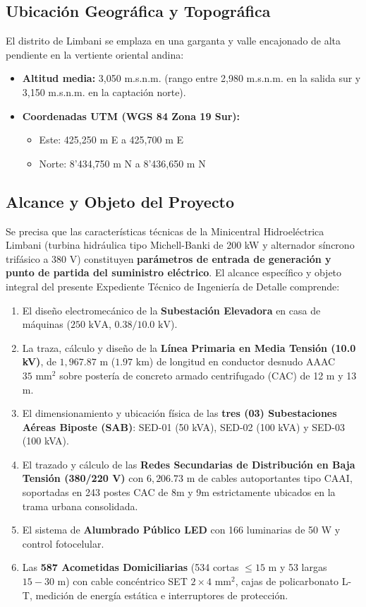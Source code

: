 \subsection{Ubicación Geográfica y Topográfica}
El distrito de Limbani se emplaza en una garganta y valle encajonado de alta pendiente en la vertiente oriental andina:
\begin{itemize}
  \item \textbf{Altitud media:} 3,050 m.s.n.m. (rango entre 2,980 m.s.n.m. en la salida sur y 3,150 m.s.n.m. en la captación norte).
  \item \textbf{Coordenadas UTM (WGS 84 Zona 19 Sur):}
    \begin{itemize}
      \item Este: 425,250 m E a 425,700 m E
      \item Norte: 8'434,750 m N a 8'436,650 m N
    \end{itemize}
\end{itemize}

\subsection{Alcance y Objeto del Proyecto}
Se precisa que las características técnicas de la Minicentral Hidroeléctrica Limbani (turbina hidráulica tipo Michell-Banki de 200 kW y alternador síncrono trifásico a 380 V) constituyen \textbf{parámetros de entrada de generación y punto de partida del suministro eléctrico}. El alcance específico y objeto integral del presente Expediente Técnico de Ingeniería de Detalle comprende:
\begin{enumerate}
  \item El diseño electromecánico de la \textbf{Subestación Elevadora} en casa de máquinas ($250\text{ kVA}$, $0.38 / 10.0\text{ kV}$).
  \item La traza, cálculo y diseño de la \textbf{Línea Primaria en Media Tensión (10.0 kV)}, de $1,967.87\text{ m}$ ($1.97\text{ km}$) de longitud en conductor desnudo AAAC $35\text{ mm}^2$ sobre postería de concreto armado centrifugado (CAC) de 12 m y 13 m.
  \item El dimensionamiento y ubicación física de las \textbf{tres (03) Subestaciones Aéreas Biposte (SAB)}: SED-01 (50 kVA), SED-02 (100 kVA) y SED-03 (100 kVA).
  \item El trazado y cálculo de las \textbf{Redes Secundarias de Distribución en Baja Tensión (380/220 V)} con $6,206.73\text{ m}$ de cables autoportantes tipo CAAI, soportadas en 243 postes CAC de 8m y 9m estrictamente ubicados en la trama urbana consolidada.
  \item El sistema de \textbf{Alumbrado Público LED} con 166 luminarias de 50 W y control fotocelular.
  \item Las \textbf{587 Acometidas Domiciliarias} (534 cortas $\le 15\text{ m}$ y 53 largas $15-30\text{ m}$) con cable concéntrico SET $2\times 4\text{ mm}^2$, cajas de policarbonato L-T, medición de energía estática e interruptores de protección.
\end{enumerate}

